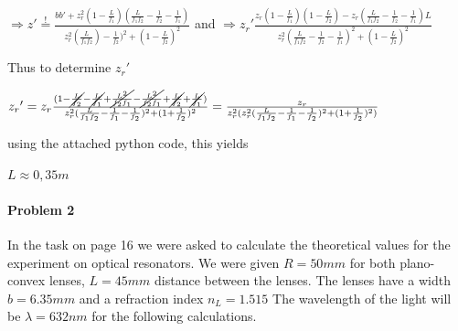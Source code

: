 \documentclass{article}
\newcommand{\mbeq}{\overset{!}{=}}
\begin{document}
$\Rightarrow{} {z}'\mbeq \frac{b{b}'+z_r^2(1-\frac{L}{f_1})(\frac{L}{f_1 f_2}-\frac{1}{f_2}-\frac{1}{f_1})}{z_r^2(\frac{L}{f_1 f_2})-\frac{1}{f_2})^2+(1-\frac{L}{f_2})^2} $
 and
 $\Rightarrow{}{} {z_r}' \frac{z_r(1-\frac{L}{f_1})(1-\frac{L}{f_2})-z_r(\frac{L}{f_1 f_2}-\frac{1}{f_2}-\frac{1}{f_1})L}{z_r^2(\frac{L}{f_1 f_2}-\frac{1}{f_2}-\frac{1}{f_1})^2+(1-\frac{L}{f_2})^2}$
 
 Thus to determine ${z_r}'$
 
 ${z_r}'=z_r\frac{(1-\cancel{\frac{L}{f_2}}-\cancel{\frac{L}{f_1}}+\cancel{\frac{L^2}{f_2 f_1}}-\cancel{\frac{L^2}{f_2 f_1}}+\cancel{\frac{L}{f_2}}+\cancel{\frac{L}{f_1}})}{z_r^2(\frac{L}{f_1 f_2}-\frac{1}{f_1}-\frac{1}{f_2})^2+(1+\frac{1}{f_2})^2}=\frac{z_r}{z_r^2(z_r^2(\frac{L}{f_1 f_2}-\frac{1}{f_1}-\frac{1}{f_2})^2+(1+\frac{1}{f_2})^2)} 
 $
 
 using the attached python code, this yields
 
 $L \approx 0,35 m$


\paragraph{Problem 2}

 In the task on page 16 we were asked to calculate the theoretical values for the experiment on optical resonators. We were given $R=50mm$ for both plano-convex lenses, $L=45mm$ distance between the lenses. The lenses have a width $b=6.35mm$ and a refraction index $n_{L} = 1.515$ The wavelength of the light will be $\lambda = 632nm$ for the following calculations.\\
\end{document}
